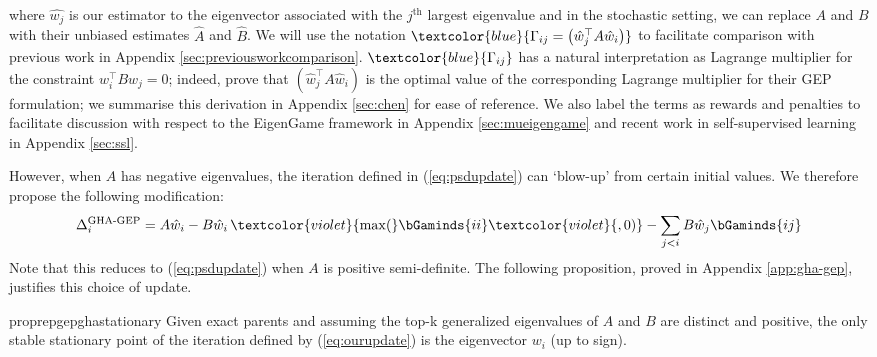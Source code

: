 where $\hat{w_j}$ is our estimator to the eigenvector associated with the $j^{\text{th}}$ largest eigenvalue and in the stochastic setting, we can replace $A$ and $B$ with their unbiased estimates $\hat{A}$ and $\hat{B}$.
We will use the notation $\textcolor{blue}{\Gamma_{ij}=\left(\hat{w}_{j}^{\top} A \hat{w}_{i}\right)}$ to facilitate comparison with previous work in Appendix \ref{sec:previousworkcomparison}.  $\textcolor{blue}{\Gamma_{ij}}$ has a natural interpretation as Lagrange multiplier for the constraint $w_i^\top B w_j = 0$; indeed, \citet{chen2019constrained} prove that $\left(\hat{w}_{j}^{\top} A \hat{w}_{i}\right)$ is the optimal value of the corresponding Lagrange multiplier for their GEP formulation; we summarise this derivation in Appendix \ref{sec:chen} for ease of reference.
We also label the terms as rewards and penalties to facilitate discussion with respect to the EigenGame framework in Appendix \ref{sec:mueigengame} and recent work in self-supervised learning in Appendix \ref{sec:ssl}.

However, when $A$ has negative eigenvalues, the iteration defined in (\ref{eq:psdupdate}) can `blow-up' from certain initial values. We therefore propose the following modification:
\begin{equation}
    \label{eq:ourupdate}
    \Delta_{i}^{\text{GHA-GEP}}=
    A \hat{w}_{i} - B\hat{w}_{i}\,\textcolor{violet}{\max(}\bGaminds{ii}\textcolor{violet}{,0)} - \sum_{j < i}B\hat{w}_{j}\bGaminds{ij}
\end{equation}
Note that this reduces to (\ref{eq:psdupdate}) when $A$ is positive semi-definite. The following proposition, proved in Appendix \ref{app:gha-gep}, justifies this choice of update.

\begin{restatable}{proprep}{gepghastationary}
    \label{prop:gep-gha-stat}
    Given exact parents and assuming the top-k generalized eigenvalues
    of $A$ and $B$ are distinct and positive, the only stable stationary point of the iteration defined by (\ref{eq:ourupdate}) is the eigenvector $w_i$ (up to sign).
\end{restatable}

